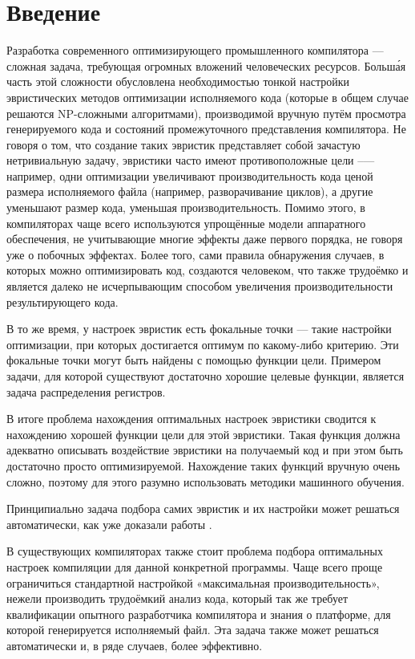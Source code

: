 \chapter{Введение}
Разработка современного оптимизирующего промышленного компилятора --- сложная задача, требующая огромных вложений человеческих ресурсов. Больш\'{а}я часть этой сложности обусловлена необходимостью тонкой настройки эвристических методов оптимизации исполняемого кода (которые в общем случае решаются NP-сложными алгоритмами), производимой вручную путём просмотра генерируемого кода и состояний промежуточного представления компилятора. Не говоря о том, что создание таких эвристик представляет собой зачастую нетривиальную задачу, эвристики часто имеют противоположные цели --— например, одни оптимизации увеличивают производительность кода ценой размера исполняемого файла (например, разворачивание циклов), а другие уменьшают размер кода, уменьшая производительность. Помимо этого, в компиляторах чаще всего используются упрощённые модели аппаратного обеспечения, не учитывающие многие эффекты даже первого порядка, не говоря уже о побочных эффектах. Более того, сами правила обнаружения случаев, в которых можно оптимизировать код, создаются человеком, что также трудоёмко и является далеко не исчерпывающим способом увеличения производительности результирующего кода.

В то же время, у настроек эвристик есть фокальные точки --- такие настройки оптимизации, при которых достигается оптимум по какому-либо критерию. Эти фокальные точки могут быть найдены с помощью функции цели. Примером задачи, для которой существуют достаточно хорошие целевые функции, является задача распределения регистров.

В итоге проблема нахождения оптимальных настроек эвристики сводится к нахождению хорошей функции цели для этой эвристики. Такая функция должна адекватно описывать воздействие эвристики на получаемый код и при этом быть достаточно просто оптимизируемой. Нахождение таких функций вручную очень сложно, поэтому для этого разумно использовать методики машинного обучения.

 Принципиально задача подбора самих эвристик и их настройки может решаться автоматически, как уже доказали работы \cite{Agakov:2006:UML:1121992.1122412,Bodin98iterativecompilation,FCA2007,Cooper:2005:AAC:1065910.1065921}. 

В существующих компиляторах также стоит проблема подбора оптимальных настроек компиляции для данной конкретной программы. Чаще всего проще ограничиться стандартной настройкой «максимальная производительность», нежели производить трудоёмкий анализ кода, который так же требует квалификации опытного разработчика компилятора и знания о платформе, для которой генерируется исполняемый файл. Эта задача также может решаться автоматически и, в ряде случаев, более эффективно.

